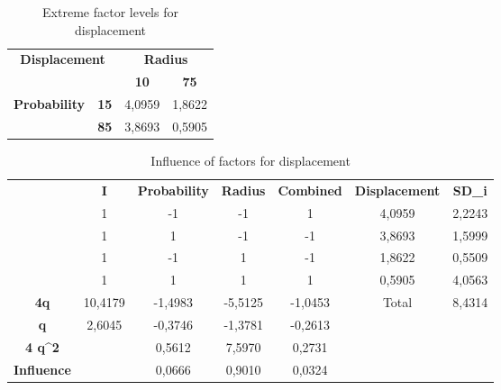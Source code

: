 \begin{table}[H]
\centering
\begin{tabular}{|cc|cc|}
\hline
\multicolumn{2}{|c|}{\multirow{2}{*}{\textbf{Displacement}}} & \multicolumn{2}{c|}{\textbf{Radius}} \\ \cline{3-4} 
\multicolumn{2}{|c|}{} & \multicolumn{1}{c|}{\textbf{10}} & \textbf{75} \\ \hline
\multicolumn{1}{|c|}{\multirow{2}{*}{\textbf{Probability}}} & \textbf{15} & \multicolumn{1}{c|}{4,0959} & 1,8622 \\ \cline{2-4} 
\multicolumn{1}{|c|}{} & \textbf{85} & \multicolumn{1}{c|}{3,8693} & 0,5905 \\ \hline
\end{tabular}
\caption{Extreme factor levels for displacement}
\end{table}

\begin{table}[H]\label{tab:InflDisp}
\centering
\begin{tabular}{c|c|c|c|c|cc}
\cline{2-7}
 & \textbf{I} & \textbf{Probability} & \textbf{Radius} & \textbf{Combined} & \multicolumn{1}{c|}{\textbf{Displacement}} & \multicolumn{1}{c|}{\textbf{SD\_i}} \\ \cline{2-7} 
 & 1 & -1 & -1 & 1 & \multicolumn{1}{c|}{4,0959} & \multicolumn{1}{c|}{2,2243} \\ \cline{2-7} 
 & 1 & 1 & -1 & -1 & \multicolumn{1}{c|}{3,8693} & \multicolumn{1}{c|}{1,5999} \\ \cline{2-7} 
 & 1 & -1 & 1 & -1 & \multicolumn{1}{c|}{1,8622} & \multicolumn{1}{c|}{0,5509} \\ \cline{2-7} 
 & 1 & 1 & 1 & 1 & \multicolumn{1}{c|}{0,5905} & \multicolumn{1}{c|}{4,0563} \\ \hline
\multicolumn{1}{|c|}{\textbf{4q}} & 10,4179 & -1,4983 & -5,5125 & -1,0453 & \multicolumn{1}{c|}{Total} & \multicolumn{1}{c|}{8,4314} \\ \hline
\multicolumn{1}{|c|}{\textbf{q}} & 2,6045 & -0,3746 & -1,3781 & -0,2613 &  &  \\ \cline{1-5}
\multicolumn{1}{|c|}{\textbf{4 q\textasciicircum{}2}} &  & 0,5612 & 7,5970 & 0,2731 &  &  \\ \cline{1-5}
\multicolumn{1}{|c|}{\textbf{Influence}} &  & 0,0666 & 0,9010 & 0,0324 &  &  \\ \cline{1-5}
\end{tabular}
\caption{Influence of factors for displacement}
\end{table}


